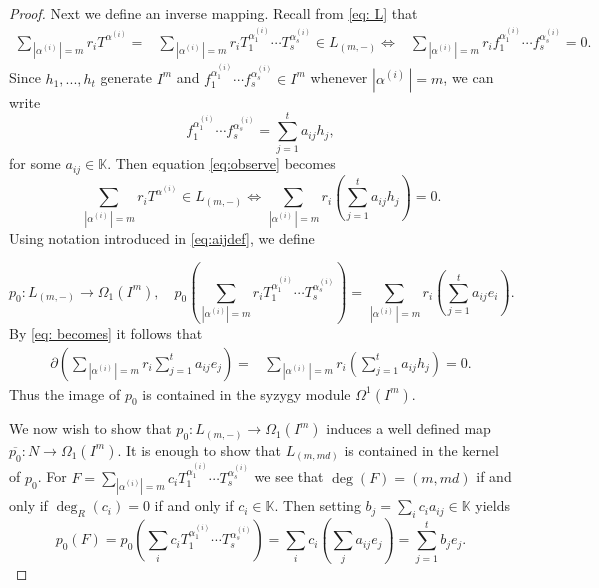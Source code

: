 \documentclass[reqno]{amsart}
\theoremstyle{definition}
\theoremstyle{remark}
\numberwithin{equation}{section}
\begin{document}
\begin{proof}
 Next we define an inverse mapping. 
  Recall from \eqref{eq: L} that
    \begin{align}\label{eq:observe}
\sum_{\,|\alpha^{(i)}\,|=m} r_iT^{\alpha^{(i)}} = &\sum_{\,|\alpha^{(i)}\,|=m} r_iT_1^{\alpha_1^{(i)}}\cdots T_s^{\alpha_s^{(i)}}\in L_{(m,-)} 
        \iff& \sum_{\,|\alpha^{(i)}\,|=m} r_i f_1^{\alpha_1^{(i)}}\cdots f_s^{\alpha_s^{(i)}}=0.
    \end{align}
Since \(h_1,...,h_t\) generate  \(I^m\) and \(f_1^{\alpha_1^{(i)}}\cdots f_s^{\alpha_s^{(i)}}\in I^m\) whenever $|\alpha^{(i)}\,|=m$,  we can write   
\begin{equation}\label{eq:aijdef}
f_1^{\alpha_1^{(i)}}\cdots f_s^{\alpha_s^{(i)}}=\sum_{j=1}^t a_{ij}h_{j},
\end{equation}
for some \(a_{ij}\in\mathbb{K}\). 
    Then equation \eqref{eq:observe} becomes
    \begin{equation}\label{eq: becomes}
        \sum_{\,|\alpha^{(i)}\,|=m} r_iT^{\alpha^{(i)}} \in L_{(m,-)}\iff \sum_{\,|\alpha^{(i)}\,|=m} r_i \left(\sum_{j=1}^ta_{ij}h_{j}\right)=0.
        \end{equation}
    Using notation introduced in \eqref{eq:aijdef}, we define
  
    \begin{equation}\label{eq: defP0}
        p_0:L_{(m,-)}\rightarrow \Omega_1\left(I^m\right),\quad
        p_0\left(\sum_{|\alpha^{(i)}|=m} r_i T_1^{\alpha_1^{(i)}}\cdots T_s^{\alpha_s^{(i)}}\right)=\sum_{\,|\alpha^{(i)}\,|=m} r_i \left(\sum_{j=1}^t a_{ij} e_{i}\right).
    \end{equation}
    By \eqref{eq: becomes} it follows that
    \begin{align*}
        \partial\left( \sum_{\,|\alpha^{(i)}\,|=m} r_i \sum_{j=1}^t a_{ij} e_{j}\right)
        =&\sum_{\,|\alpha^{(i)}\,|=m} r_i \left(\sum_{j=1}^t a_{ij} h_{j}\right)=0.
    \end{align*}
    Thus the image of $p_0$ is contained in the syzygy module \(\Omega^1(I^m)\).

    We now wish to show that $p_0: L_{(m, -)} \to \Omega_1(I^m)$ induces a well defined map $\overline{p_0}: N \to \Omega_1(I^m)$. 
    It is enough to show that $L_{(m,md)}$ is contained in the kernel of $p_0$. For \(F=\sum_{|\alpha^{(i)}|=m}c_iT_1^{\alpha_1^{(i)}}\cdots T_s^{\alpha_s^{(i)}}\) we see that \(\deg{(F)}=(m,md)\) if and only if $\deg_R(c_i)=0$ if and only if $c_i \in \mathbb{K}$. 
    Then setting  \(b_j=\sum_{i} c_ia_{ij}\in\mathbb{K}\) yields
    \[p_0(F)=p_0\left(\sum_{i}c_iT_1^{\alpha_1^{(i)}}\cdots T_s^{\alpha_s^{(i)}}\right)=\sum_{i}c_i\left(\sum_j a_{ij}e_{j }\right)=\sum_{j=1}^t b_je_j.\]
   

\end{proof}
\end{document}
